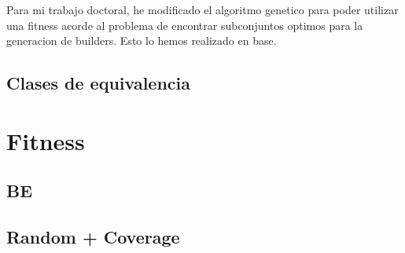 Para mi trabajo doctoral, he modificado el algoritmo genetico para poder utilizar una fitness acorde al problema de encontrar subconjuntos optimos para la generacion de builders.
Esto lo hemos realizado en base.

\subsection{Clases de equivalencia}
\label{alg:approachCE}
\section{Fitness}
\subsection{BE}

\subsection{Random + Coverage}
